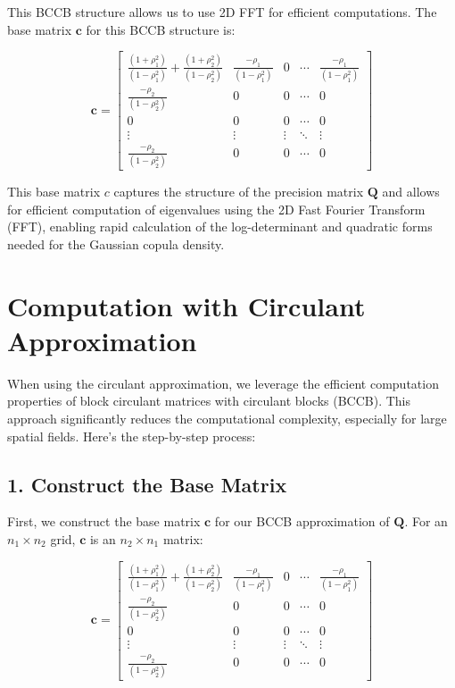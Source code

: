 \documentclass[
  12pt]{article}
\begin{document}
This BCCB structure allows us to use 2D FFT for efficient computations.
The base matrix \(\mathbf c\) for this BCCB structure is:

\[
\mathbf{c} = \begin{bmatrix}
\frac{(1+\rho_1^2)}{(1 - \rho_1^2)} + \frac{(1+\rho_2^2)}{(1 - \rho_2^2)} & \frac{-\rho_1}{(1 - \rho_1^2)} & 0 & \cdots  & \frac{-\rho_1}{(1 - \rho_1^2)} \\
\frac{-\rho_2}{(1 - \rho_2^2)} & 0 & 0 & \cdots  & 0 \\
0 & 0 & 0 & \cdots  & 0 \\
\vdots & \vdots & \vdots & \ddots &  \vdots \\
\frac{-\rho_2}{(1 - \rho_2^2)} & 0 & 0 & \cdots  & 0
\end{bmatrix}
\]

This base matrix \(c\) captures the structure of the precision matrix
\(\mathbf Q\) and allows for efficient computation of eigenvalues using
the 2D Fast Fourier Transform (FFT), enabling rapid calculation of the
log-determinant and quadratic forms needed for the Gaussian copula
density.

\section{Computation with Circulant
Approximation}\label{computation-with-circulant-approximation}

When using the circulant approximation, we leverage the efficient
computation properties of block circulant matrices with circulant blocks
(BCCB). This approach significantly reduces the computational
complexity, especially for large spatial fields. Here's the step-by-step
process:

\subsection{1. Construct the Base
Matrix}\label{construct-the-base-matrix}

First, we construct the base matrix \(\mathbf c\) for our BCCB
approximation of \(\mathbf Q\). For an \(n_1 \times n_2\) grid,
\(\mathbf c\) is an \(n_2 \times n_1\) matrix:

\[
\mathbf{c} = \begin{bmatrix}
\frac{(1+\rho_1^2)}{(1 - \rho_1^2)} + \frac{(1+\rho_2^2)}{(1 - \rho_2^2)} & \frac{-\rho_1}{(1 - \rho_1^2)} & 0 & \cdots  & \frac{-\rho_1}{(1 - \rho_1^2)} \\
\frac{-\rho_2}{(1 - \rho_2^2)} & 0 & 0 & \cdots  & 0 \\
0 & 0 & 0 & \cdots  & 0 \\
\vdots & \vdots & \vdots & \ddots &  \vdots \\
\frac{-\rho_2}{(1 - \rho_2^2)} & 0 & 0 & \cdots  & 0
\end{bmatrix}
\]
\end{document}
